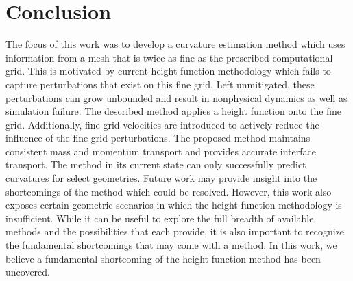 \section{Conclusion}
The focus of this work was to develop a curvature estimation method which uses information from a mesh that is twice as fine as the prescribed computational grid. This is motivated by current height function methodology which fails to capture perturbations that exist on this fine grid. Left unmitigated, these perturbations can grow unbounded and result in nonphysical dynamics as well as simulation failure. The described method applies a height function onto the fine grid. Additionally, fine grid velocities are introduced to actively reduce the influence of the fine grid perturbations. The proposed method maintains consistent mass and momentum transport and provides accurate interface transport. The method in its current state can only successfully predict curvatures for select geometries. Future work may provide insight into the shortcomings of the method which could be resolved.  However, this work also exposes certain geometric scenarios in which the height function methodology is insufficient. While it can be useful to explore the full breadth of available methods and the possibilities that each provide, it is also important to recognize the fundamental shortcomings that may come with a method. In this work, we believe a fundamental shortcoming of the height function method has been uncovered. 


